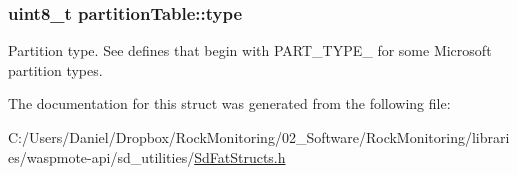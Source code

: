 \subsubsection[{\texorpdfstring{type}{type}}]{\setlength{\rightskip}{0pt plus 5cm}uint8\+\_\+t partition\+Table\+::type}\hypertarget{structpartition_table_a3861cf276c728c4dd30ca04e74197ee8}{}\label{structpartition_table_a3861cf276c728c4dd30ca04e74197ee8}
Partition type. See defines that begin with P\+A\+R\+T\+\_\+\+T\+Y\+P\+E\+\_\+ for some Microsoft partition types. 

The documentation for this struct was generated from the following file\+:\begin{DoxyCompactItemize}
\item 
C\+:/\+Users/\+Daniel/\+Dropbox/\+Rock\+Monitoring/02\+\_\+\+Software/\+Rock\+Monitoring/libraries/waspmote-\/api/sd\+\_\+utilities/\hyperlink{_sd_fat_structs_8h}{Sd\+Fat\+Structs.\+h}\end{DoxyCompactItemize}
